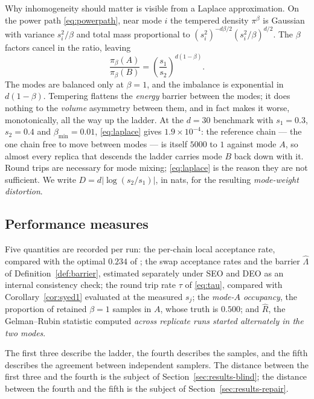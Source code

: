 Why inhomogeneity should matter is visible from a Laplace approximation. On the
power path \eqref{eq:powerpath}, near mode $i$ the tempered density
$\pi^\beta$ is Gaussian with variance $s_i^2/\beta$ and total mass proportional
to $(s_i^2)^{-d\beta/2}(s_i^2/\beta)^{d/2}$. The $\beta$ factors cancel in the
ratio, leaving
\begin{equation}
  \boxed{\ \frac{\pi_\beta(A)}{\pi_\beta(B)}
   =\left(\frac{s_1}{s_2}\right)^{d(1-\beta)}. \ }
  \label{eq:laplace}
\end{equation}
The modes are balanced only at $\beta=1$, and the imbalance is exponential in
$d(1-\beta)$. Tempering flattens the \emph{energy} barrier between the modes; it
does nothing to the \emph{volume} asymmetry between them, and in fact makes it
worse, monotonically, all the way up the ladder. At the $d=30$ benchmark with
$s_1=0.3$, $s_2=0.4$ and $\beta_{\min}=0.01$, \eqref{eq:laplace} gives
$1.9\times10^{-4}$: the reference chain --- the one chain free to move between
modes --- is itself $5000$ to $1$ against mode $A$, so almost every replica that
descends the ladder carries mode $B$ back down with it. Round trips are necessary
for mode mixing; \eqref{eq:laplace} is the reason they are not sufficient. We
write $D=d\lvert\log(s_2/s_1)\rvert$, in nats, for the resulting
\emph{mode-weight distortion}.

\subsection{Performance measures}

Five quantities are recorded per run: the per-chain local acceptance rate,
compared with the optimal $0.234$ of \citet{roberts1997}; the swap acceptance
rates and the barrier $\hat\Lambda$ of Definition~\ref{def:barrier}, estimated
separately under SEO and DEO as an internal consistency check; the round trip
rate $\tau$ of \eqref{eq:tau}, compared with Corollary~\ref{cor:syed1} evaluated
at the measured $s_j$; the \emph{mode-$A$ occupancy}, the proportion of retained
$\beta=1$ samples in $A$, whose truth is $0.500$; and $\hat R$, the
Gelman--Rubin statistic computed \emph{across replicate runs started alternately
in the two modes}.

The first three describe the ladder, the fourth describes the samples, and the
fifth describes the agreement between independent samplers. The distance between
the first three and the fourth is the subject of Section~\ref{sec:results-blind};
the distance between the fourth and the fifth is the subject of
Section~\ref{sec:results-repair}.

